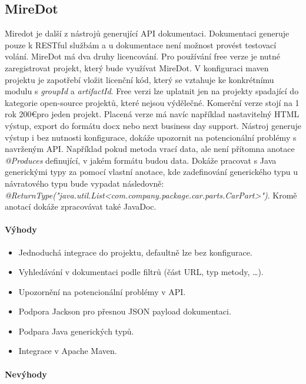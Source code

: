 \documentclass[11pt,twoside,a4paper]{book}
\begin{document}
\subsection{MireDot}

Miredot \cite{MiredotHome} je další z nástrojů generující API dokumentaci. Dokumentaci
generuje pouze k RESTful službám a u dokumentace není možnost provést testovací
volání.
MireDot má dva druhy licencování. Pro používání free verze je nutné zaregistrovat 
projekt, který bude využívat MireDot. V konfiguraci maven projektu je zapotřebí 
vložit licenční kód, který se vztahuje ke konkrétnímu modulu s {\em groupId} a
{\em artifactId}.
Free verzi lze uplatnit jen na projekty spadající do kategorie open-source projektů, 
které nejsou výdělečné. Komerční verze stojí na 1 rok 200\euro pro jeden
projekt.
Placená verze má navíc například nastavitelný HTML výstup, export do formátu 
docx nebo next business day support. Nástroj generuje výstup i bez nutnosti 
konfigurace, dokáže upozornit na potencionální problémy s navrženým API. Například 
pokud metoda vrací data, ale není přítomna anotace {\em @Produces} definující, v
jakém formátu budou data. Dokáže pracovat s Java generickými typy za pomocí
vlastní anotace, kde zadefinování generického typu u návratového typu bude vypadat následovně: 
{\em @ReturnType("java.util.List<com.company.package.car.parts.CarPart>")}.
Kromě anotací dokáže zpracovávat také JavaDoc.

\paragraph{Výhody}

\begin{itemize}
  \item Jednoduchá integrace do projektu, defaultně lze bez konfigurace.
  \item Vyhledávání v dokumentaci podle filtrů (část URL, typ metody, \ldots).
  \item Upozornění na potencionální problémy v API.
  \item Podpora Jackson pro přesnou JSON payload dokumentaci.
  \item Podpara Java generických typů.
  \item Integrace v Apache Maven.
\end{itemize}

\paragraph{Nevýhody}
\end{document}
